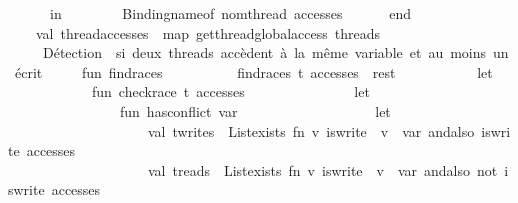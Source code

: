 \begin{isabellebody}
\ \ \ \ \ \ in\isanewline
\ \ \ \ \ \ \ \ {\isacharparenleft}{\kern0pt}Binding{\isachardot}{\kern0pt}name{\isacharunderscore}{\kern0pt}of\ nom{\isacharunderscore}{\kern0pt}thread{\isacharcomma}{\kern0pt}\ accesses{\isacharparenright}{\kern0pt}\isanewline
\ \ \ \ \ \ end\isanewline
\ \ \ \ \isanewline
\ \ \ \ val\ thread{\isacharunderscore}{\kern0pt}accesses\ {\isacharequal}{\kern0pt}\ map\ get{\isacharunderscore}{\kern0pt}thread{\isacharunderscore}{\kern0pt}global{\isacharunderscore}{\kern0pt}access\ threads\isanewline
\ \ \ \ \isanewline
\ \ \ \ {\isacharparenleft}{\kern0pt}{\isacharasterisk}{\kern0pt}\ Détection\ {\isacharcolon}{\kern0pt}\ si\ deux\ threads\ accèdent\ à\ la\ même\ variable\ et\ au\ moins\ un\ écrit\ {\isacharasterisk}{\kern0pt}{\isacharparenright}{\kern0pt}\isanewline
\ \ \ \ fun\ find{\isacharunderscore}{\kern0pt}races\ {\isacharbrackleft}{\kern0pt}{\isacharbrackright}{\kern0pt}\ {\isacharequal}{\kern0pt}\ {\isacharbrackleft}{\kern0pt}{\isacharbrackright}{\kern0pt}\isanewline
\ \ \ \ \ \ {\isacharbar}{\kern0pt}\ find{\isacharunderscore}{\kern0pt}races\ {\isacharparenleft}{\kern0pt}{\isacharparenleft}{\kern0pt}t{}{\isacharcomma}{\kern0pt}\ accesses{}{\isacharparenright}{\kern0pt}\ {\isacharcolon}{\kern0pt}{\isacharcolon}{\kern0pt}\ rest{\isacharparenright}{\kern0pt}\ {\isacharequal}{\kern0pt}\isanewline
\ \ \ \ \ \ \ \ \ \ let\isanewline
\ \ \ \ \ \ \ \ \ \ \ \ fun\ check{\isacharunderscore}{\kern0pt}race\ {\isacharparenleft}{\kern0pt}t{}{\isacharcomma}{\kern0pt}\ accesses{}{\isacharparenright}{\kern0pt}\ {\isacharequal}{\kern0pt}\isanewline
\ \ \ \ \ \ \ \ \ \ \ \ \ \ let\isanewline
\ \ \ \ \ \ \ \ \ \ \ \ \ \ \ \ fun\ has{\isacharunderscore}{\kern0pt}conflict\ var\ {\isacharequal}{\kern0pt}\isanewline
\ \ \ \ \ \ \ \ \ \ \ \ \ \ \ \ \ \ let\isanewline
\ \ \ \ \ \ \ \ \ \ \ \ \ \ \ \ \ \ \ \ val\ t{}{\isacharunderscore}{\kern0pt}writes\ {\isacharequal}{\kern0pt}\ List{\isachardot}{\kern0pt}exists\ {\isacharparenleft}{\kern0pt}fn\ {\isacharparenleft}{\kern0pt}v{\isacharcomma}{\kern0pt}\ is{\isacharunderscore}{\kern0pt}write{\isacharparenright}{\kern0pt}\ {\isacharequal}{\kern0pt}{\isachargreater}{\kern0pt}\ v\ {\isacharequal}{\kern0pt}\ var\ andalso\ is{\isacharunderscore}{\kern0pt}write{\isacharparenright}{\kern0pt}\ accesses{}\isanewline
\ \ \ \ \ \ \ \ \ \ \ \ \ \ \ \ \ \ \ \ val\ t{}{\isacharunderscore}{\kern0pt}reads\ {\isacharequal}{\kern0pt}\ List{\isachardot}{\kern0pt}exists\ {\isacharparenleft}{\kern0pt}fn\ {\isacharparenleft}{\kern0pt}v{\isacharcomma}{\kern0pt}\ is{\isacharunderscore}{\kern0pt}write{\isacharparenright}{\kern0pt}\ {\isacharequal}{\kern0pt}{\isachargreater}{\kern0pt}\ v\ {\isacharequal}{\kern0pt}\ var\ andalso\ not\ is{\isacharunderscore}{\kern0pt}write{\isacharparenright}{\kern0pt}\ accesses{}\isanewline

\end{isabellebody}
